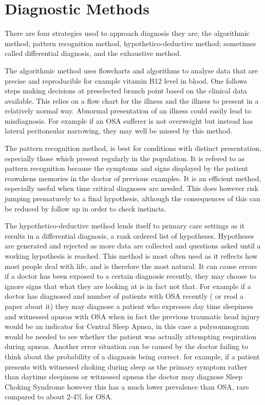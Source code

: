 \section{Diagnostic Methods}
\label{sec:diagnosticMethods-sophie}
There are four strategies used to approach diagnosis they are; the algorithmic method, pattern recognition method, hypothetico-deductive method; sometimes called differential diagnosis, and the exhaustive method. 

The algorithmic method uses flowcharts and algorithms to analyse data that are precise and reproducible for example vitamin B12 level in blood. One follows steps making decisions at preselected branch point based on the clinical data available. This relies on a flow chart for the illness and the illness to present in a relatively normal way. Abnormal presentation of an illness could easily lead to misdiagnosis. For example if an OSA sufferer is not overweight but instead has lateral peritonsular narrowing, they may well be missed by this method. 

The pattern recognition method, is best for conditions with distinct presentation, especially those which present regularly in the population. It is refered to as pattern recognition because the symptoms and signs displayed by the patient reawakens memories in the doctor of previous examples. It is an efficient method, especially useful when time critical diagnoses are needed. This does however risk jumping prematurely to a final hypothesis, although the consequences of this can be reduced by follow up in order to check instincts. 

The hypothetico-deductive method lends itself to primary care settings as it results in a differential diagnosis, a rank ordered list of hypotheses. Hypotheses are generated and rejected as more data are collected and questions asked until a working hypothesis is reached. This method is most often used as it reflects how most people deal with life, and is therefore the most natural. It can cause errors if a doctor has been exposed to a certain diagnosis recently, they may choose to ignore signs that what they are looking at is in fact not that. For example if a doctor has diagnosed and number of patients with OSA recently ( or read a paper about it) they may diagnose a patient who expresses day time sleepiness and witnessed apneas with OSA when in fact the previous traumatic head injury would be an indicator for Central Sleep Apnea, in this case a polysomnogram would be needed to see whether the patient was actually attempting respiration during apneas. Another error situation can be caused by the doctor failing to think about the probability of a diagnosis being correct. for example, if a patient presents with witnessed choking during sleep as the primary symptom rather than daytime sleepiness or witnessed apneas the doctor may diagnose Sleep Choking Syndrome however this has a much lower prevalence than OSA, rare compared to about 2-4\% for OSA.

